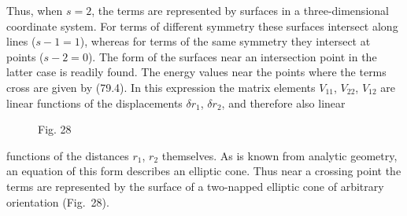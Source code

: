 Thus, when $s=2$, the terms are represented by surfaces in a three-dimensional coordinate system. For terms of different symmetry these surfaces intersect along lines ($s-1=1$), whereas for terms of the same symmetry they intersect at points ($s-2=0$). The form of the surfaces near an intersection point in the latter case is readily found. The energy values near the points where the terms cross are given by (79.4). In this expression the matrix elements $V_{11}$, $V_{22}$, $V_{12}$ are linear functions of the displacements $\delta r_1$, $\delta r_2$, and therefore also linear

\begin{figure}[ht]
\centering
{}
\caption*{Fig. 28}
\end{figure}

functions of the distances $r_1$, $r_2$ themselves. As is known from analytic geometry, an equation of this form describes an elliptic cone. Thus near a crossing point the terms are represented by the surface of a two-napped elliptic cone of arbitrary orientation (Fig.~28).

